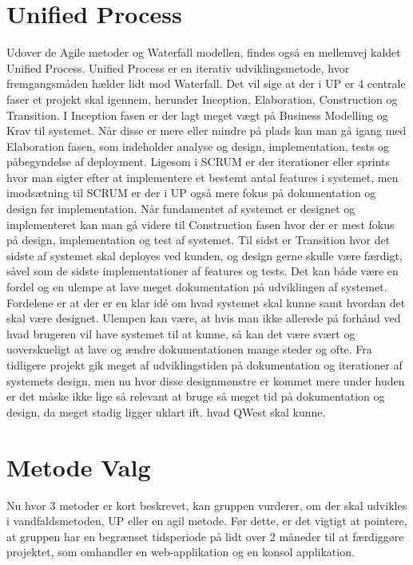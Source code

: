\section{Unified Process}
Udover de Agile metoder og Waterfall modellen, findes også en mellemvej kaldet Unified Process\cite{UnifiedProcess}. Unified Process er en iterativ udviklingsmetode, hvor fremgangsmåden hælder lidt mod Waterfall. Det vil sige at der i UP er 4 centrale faser et projekt skal igennem, herunder Inception, Elaboration, Construction og Transition. I Inception fasen er der lagt meget vægt på Business Modelling og Krav til systemet. Når disse er mere eller mindre på plads kan man gå igang med Elaboration fasen, som indeholder analyse og design, implementation, tests og påbegyndelse af deployment. Ligesom i SCRUM er der iterationer eller sprints hvor man sigter efter at implementere et bestemt antal features i systemet, men imodsætning til SCRUM er der i UP også mere fokus på dokumentation og design før implementation. Når fundamentet af systemet er designet og implementeret kan man gå videre til Construction fasen hvor der er mest fokus på design, implementation og test af systemet. Til sidst er Transition hvor det sidste af systemet skal deployes ved kunden, og design gerne skulle være færdigt, såvel som de sidste implementationer af features og tests. 
Det kan både være en fordel og en ulempe at lave meget dokumentation på udviklingen af systemet. Fordelene er at der er en klar idé om hvad systemet skal kunne samt hvordan det skal være designet. Ulempen kan være, at hvis man ikke allerede på forhånd ved hvad brugeren vil have systemet til at kunne, så kan det være svært og uoverskueligt at lave og ændre dokumentationen mange steder og ofte. Fra tidligere projekt gik meget af udviklingstiden på dokumentation og iterationer af systemets design, men nu hvor disse designmønstre er kommet mere under huden er det måske ikke lige så relevant at bruge så meget tid på dokumentation og design, da meget stadig ligger uklart ift. hvad QWest skal kunne.

\section{Metode Valg}

Nu hvor 3 metoder er kort beskrevet, kan gruppen vurderer, om der skal udvikles i vandfaldsmetoden, UP eller en agil metode. Før dette, er det vigtigt at pointere, at gruppen har en begrænset tidsperiode på lidt over 2 måneder til at færdiggøre projektet, som omhandler en web-applikation og en konsol applikation.


